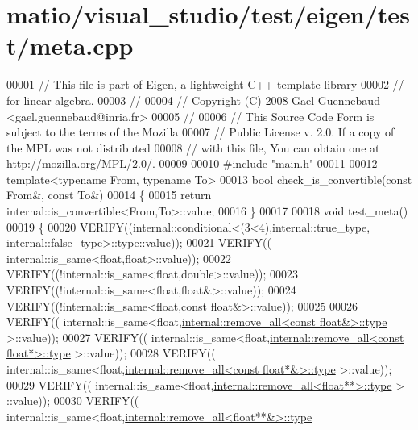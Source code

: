 \hypertarget{matio_2visual__studio_2test_2eigen_2test_2meta_8cpp_source}{}\section{matio/visual\+\_\+studio/test/eigen/test/meta.cpp}
\label{matio_2visual__studio_2test_2eigen_2test_2meta_8cpp_source}

\begin{DoxyCode}
00001 \textcolor{comment}{// This file is part of Eigen, a lightweight C++ template library}
00002 \textcolor{comment}{// for linear algebra.}
00003 \textcolor{comment}{//}
00004 \textcolor{comment}{// Copyright (C) 2008 Gael Guennebaud <gael.guennebaud@inria.fr>}
00005 \textcolor{comment}{//}
00006 \textcolor{comment}{// This Source Code Form is subject to the terms of the Mozilla}
00007 \textcolor{comment}{// Public License v. 2.0. If a copy of the MPL was not distributed}
00008 \textcolor{comment}{// with this file, You can obtain one at http://mozilla.org/MPL/2.0/.}
00009 
00010 \textcolor{preprocessor}{#include "main.h"}
00011 
00012 \textcolor{keyword}{template}<\textcolor{keyword}{typename} From, \textcolor{keyword}{typename} To>
00013 \textcolor{keywordtype}{bool} check\_is\_convertible(\textcolor{keyword}{const} From&, \textcolor{keyword}{const} To&)
00014 \{
00015   \textcolor{keywordflow}{return} internal::is\_convertible<From,To>::value;
00016 \}
00017 
00018 \textcolor{keywordtype}{void} test\_meta()
00019 \{
00020   VERIFY((internal::conditional<(3<4),internal::true\_type, internal::false\_type>::type::value));
00021   VERIFY(( internal::is\_same<float,float>::value));
00022   VERIFY((!internal::is\_same<float,double>::value));
00023   VERIFY((!internal::is\_same<float,float&>::value));
00024   VERIFY((!internal::is\_same<float,const float&>::value));
00025   
00026   VERIFY(( internal::is\_same<\textcolor{keywordtype}{float},\hyperlink{group___sparse_core___module}{internal::remove\_all<const float&>::type}
       >::value));
00027   VERIFY(( internal::is\_same<\textcolor{keywordtype}{float},\hyperlink{group___sparse_core___module}{internal::remove\_all<const float*>::type}
       >::value));
00028   VERIFY(( internal::is\_same<\textcolor{keywordtype}{float},\hyperlink{group___sparse_core___module}{internal::remove\_all<const float*&>::type}
       >::value));
00029   VERIFY(( internal::is\_same<\textcolor{keywordtype}{float},\hyperlink{group___sparse_core___module}{internal::remove\_all<float**>::type} >
      ::value));
00030   VERIFY(( internal::is\_same<\textcolor{keywordtype}{float},\hyperlink{group___sparse_core___module}{internal::remove\_all<float**&>::type}

\end{DoxyCode}
